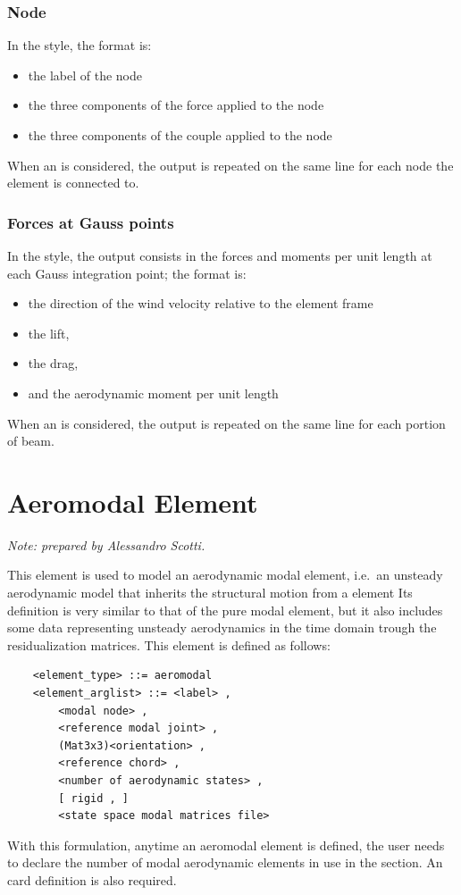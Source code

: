 \subsubsection{Node}
In the  style, the format is:
\begin{itemize}
    \item the label of the node
    \item the three components of the force applied to the node
    \item the three components of the couple applied to the node
\end{itemize}
When an  is considered, the output is repeated 
on the same line for each node the element is connected to.

\subsubsection{Forces at Gauss points}
In the  style, the output consists in the forces and moments
per unit length at each Gauss integration point; the format is:
\begin{itemize}
    \item the direction of the wind velocity relative to the element frame
    \item the lift,
    \item the drag,
    \item and the aerodynamic moment per unit length
\end{itemize}
When an  is considered, the output 
is repeated on the same line for each portion of beam.



\section{Aeromodal Element}
\emph{Note: prepared by Alessandro Scotti.}

\noindent
This element is used to model an aerodynamic modal element,
i.e.\ an unsteady aerodynamic model that inherits the structural 
motion from a   element
Its definition is very similar to that of the pure modal element, 
but it also includes some data representing unsteady aerodynamics 
in the time domain trough the residualization matrices.
This element is defined as follows:
\begin{verbatim}
    <element_type> ::= aeromodal
    <element_arglist> ::= <label> , 
        <modal node> ,  
        <reference modal joint> ,
        (Mat3x3)<orientation> ,
        <reference chord> ,
        <number of aerodynamic states> ,
        [ rigid , ]
        <state space modal matrices file>
\end{verbatim}
With this formulation, anytime an aeromodal element is defined, 
the user needs to declare the number of modal aerodynamic elements 
in use in the  section.
An 
card definition is also required.

